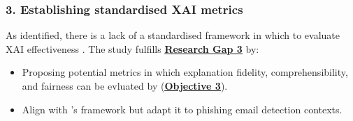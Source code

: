 
\subsubsection*{3. Establishing standardised XAI metrics}
As identified, there is a lack of a standardised framework in which to evaluate XAI effectiveness \citep{reddy2023explainable}. The study fulfills \hyperref[research-gap-3]{\uline{\textbf{Research Gap 3}}} by:

\begin{itemize}
  \item Proposing potential metrics in which explanation fidelity, comprehensibility, and fairness can be evluated by (\hyperref[objective-3]{\uline{\textbf{Objective 3}}}).
  \item Align with \cite{shendkar2024enhancing}'s framework but adapt it to phishing email detection contexts.
\end{itemize}
